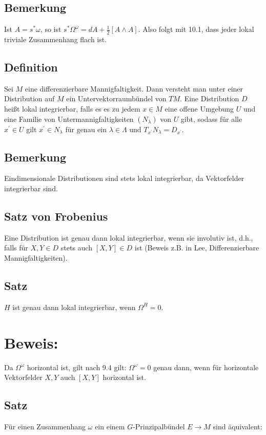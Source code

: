 \documentclass[10pt, letterpaper]{article}
\begin{document}
\subsection*{Bemerkung}
Ist $A=s^{*} \omega$, so ist $s^{*} \Omega^{\omega}=d A+\frac{1}{2}[A \wedge A]$. Also folgt mit 10.1, dass jeder lokal triviale Zusammenhang flach ist.

\subsection*{Definition}
Sei $M$ eine differenzierbare Mannigfaltigkeit. Dann versteht man unter einer Distribution auf $M$ ein Untervektorraumbündel von $T M$. Eine Distribution $D$ heißt lokal integrierbar, falls es es zu jedem $x \in M$ eine offene Umgebung $U$ und eine Familie von Untermannigfaltigkeiten $\left(N_{\lambda}\right)$ von $U$ gibt, sodass für alle $x^{\prime} \in U$ gilt $x^{\prime} \in N_{\lambda}$ für genau ein $\lambda \in \Lambda$ und $T_{x^{\prime}} N_{\lambda}=D_{x^{\prime}}$.

\subsection*{Bemerkung}
Eindimensionale Distributionen sind stets lokal integrierbar, da Vektorfelder integrierbar sind.

\subsection*{Satz von Frobenius}
Eine Distribution ist genau dann lokal integrierbar, wenn sie involutiv ist, d.h., falls für $X, Y \in D$ stets auch $[X, Y] \in D$ ist (Beweis z.B. in Lee, Differenzierbare Mannigfaltigkeiten).

\subsection*{Satz}
$H$ ist genau dann lokal integrierbar, wenn $\Omega^{H}=0$.

\section*{Beweis:}
Da $\Omega^{\omega}$ horizontal ist, gilt nach 9.4 gilt: $\Omega^{\omega}=0$ genau dann, wenn für horizontale Vektorfelder $X, Y$ auch $[X, Y]$ horizontal ist.

\subsection*{Satz}
Für einen Zusammenhang $\omega$ ein einem $G$-Prinzipalbündel $E \rightarrow M$ sind äquivalent:
\end{document}
